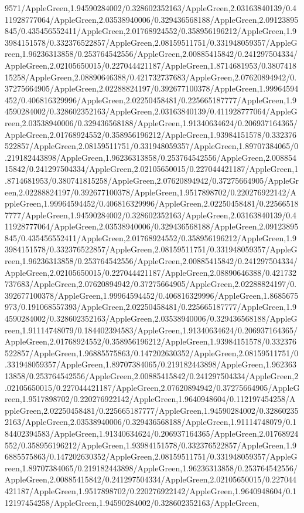 {\begin{tikzternal}
{9571/AppleGreen,1.94590284002/0.328602352163/AppleGreen,2.03163840139/0.411928777064/AppleGreen,2.03538940006/0.329436568188/AppleGreen,2.09123895845/0.435456552411/AppleGreen,2.01768924552/0.358956196212/AppleGreen,1.93984151578/0.332376522857/AppleGreen,2.08159511751/0.331948059357/AppleGreen,1.96236313858/0.253764542556/AppleGreen,2.00885415842/0.241297504334/AppleGreen,2.02105650015/0.227044421187/AppleGreen,1.8714681953/0.380741815258/AppleGreen,2.08890646388/0.421732737683/AppleGreen,2.07620894942/0.37275664905/AppleGreen,2.02288824197/0.392677100378/AppleGreen,1.99964594452/0.406816329996/AppleGreen,2.02250458481/0.225665187777/AppleGreen,1.94590284002/0.328602352163/AppleGreen,2.03163840139/0.411928777064/AppleGreen,2.03538940006/0.329436568188/AppleGreen,1.91340634624/0.206937164365/AppleGreen,2.01768924552/0.358956196212/AppleGreen,1.93984151578/0.332376522857/AppleGreen,2.08159511751/0.331948059357/AppleGreen,1.89707384065/0.219182443898/AppleGreen,1.96236313858/0.253764542556/AppleGreen,2.00885415842/0.241297504334/AppleGreen,2.02105650015/0.227044421187/AppleGreen,1.8714681953/0.380741815258/AppleGreen,2.07620894942/0.37275664905/AppleGreen,2.02288824197/0.392677100378/AppleGreen,1.9517898702/0.220276922142/AppleGreen,1.99964594452/0.406816329996/AppleGreen,2.02250458481/0.225665187777/AppleGreen,1.94590284002/0.328602352163/AppleGreen,2.03163840139/0.411928777064/AppleGreen,2.03538940006/0.329436568188/AppleGreen,2.09123895845/0.435456552411/AppleGreen,2.01768924552/0.358956196212/AppleGreen,1.93984151578/0.332376522857/AppleGreen,2.08159511751/0.331948059357/AppleGreen,1.96236313858/0.253764542556/AppleGreen,2.00885415842/0.241297504334/AppleGreen,2.02105650015/0.227044421187/AppleGreen,2.08890646388/0.421732737683/AppleGreen,2.07620894942/0.37275664905/AppleGreen,2.02288824197/0.392677100378/AppleGreen,1.99964594452/0.406816329996/AppleGreen,1.8685675973/0.191068557393/AppleGreen,2.02250458481/0.225665187777/AppleGreen,1.94590284002/0.328602352163/AppleGreen,2.03538940006/0.329436568188/AppleGreen,1.91114748079/0.184402394583/AppleGreen,1.91340634624/0.206937164365/AppleGreen,2.01768924552/0.358956196212/AppleGreen,1.93984151578/0.332376522857/AppleGreen,1.96885575863/0.147202630352/AppleGreen,2.08159511751/0.331948059357/AppleGreen,1.89707384065/0.219182443898/AppleGreen,1.96236313858/0.253764542556/AppleGreen,2.00885415842/0.241297504334/AppleGreen,2.02105650015/0.227044421187/AppleGreen,2.07620894942/0.37275664905/AppleGreen,1.9517898702/0.220276922142/AppleGreen,1.9640948604/0.112197454258/AppleGreen,2.02250458481/0.225665187777/AppleGreen,1.94590284002/0.328602352163/AppleGreen,2.03538940006/0.329436568188/AppleGreen,1.91114748079/0.184402394583/AppleGreen,1.91340634624/0.206937164365/AppleGreen,2.01768924552/0.358956196212/AppleGreen,1.93984151578/0.332376522857/AppleGreen,1.96885575863/0.147202630352/AppleGreen,2.08159511751/0.331948059357/AppleGreen,1.89707384065/0.219182443898/AppleGreen,1.96236313858/0.253764542556/AppleGreen,2.00885415842/0.241297504334/AppleGreen,2.02105650015/0.227044421187/AppleGreen,1.9517898702/0.220276922142/AppleGreen,1.9640948604/0.112197454258/AppleGreen,1.94590284002/0.328602352163/AppleGreen,
}
\end{tikzternal}}
